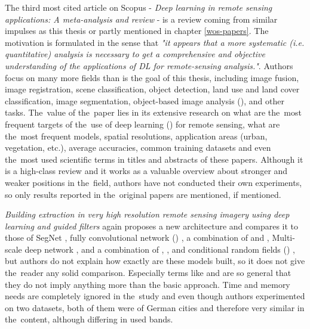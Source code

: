 The third most cited article on Scopus - \textit{Deep learning in remote sensing applications: A meta-analysis and review} - is a review coming from similar impulses as this thesis or partly \cite{landslide-evaluation} mentioned in chapter \ref{wos-papers}. The motivation is formulated in the sense that \textit{"it appears that a more systematic (i.e. quantitative) analysis is necessary to get a comprehensive and objective understanding of the applications of DL for remote-sensing analysis."}. Authors focus on many more fields than is the goal of this thesis, including image fusion, image registration, scene classification, object detection, land use and land cover classification, image segmentation, object-based image analysis (), and other tasks. The~value of the~paper lies in its extensive research on what are the~most frequent targets of the~use of deep learning () for remote sensing, what are the~most frequent  models, spatial resolutions, application areas (urban, vegetation, etc.), average accuracies, common training datasets and even the~most used scientific terms in titles and abstracts of these papers. Although it is a high-class review and it works as a valuable overview about  stronger and weaker positions in the~field, authors have not conducted their own experiments, so only results reported in the~original papers are mentioned, if mentioned.

\textit{Building extraction in very high resolution remote sensing imagery using deep learning and guided filters} again proposes a new architecture and compares it to those of SegNet \cite{segnet}, fully convolutional network () \cite{fcn}, a combination of  and , Multi-scale deep network \cite{hierarchical-labeling}, and a combination of , , and conditional random fields () \cite{hierarchical-labeling}, but authors do not explain how exactly are these models built, so it does not give the~reader any solid comparison. Especially terms like  and  are so general that they do not imply anything more than the basic approach. Time and memory needs are completely ignored in the~study and even though authors experimented on two datasets, both of them were of German cities and therefore very similar in the~content, although differing in used bands.


